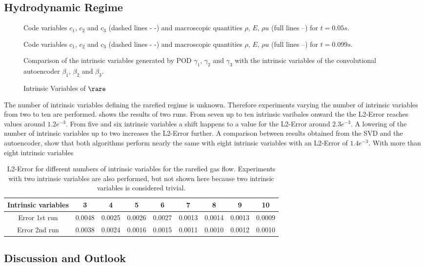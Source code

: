 \subsection{Hydrodynamic Regime}

\begin{figure}[!htbp]
	\scalebox{1}{}
	\caption{Code variables \(c_1\), \(c_2\) and \(c_3\) (dashed lines - -) and macroscopic quantities \(\rho\), \(E\), \(\rho u\) (full lines --) for \(t=0.05s\).}
\end{figure}
\begin{figure}[!htbp]
	\scalebox{1}{}
	\caption{Code variables \(c_1\), \(c_2\) and \(c_3\) (dashed lines - -) and macroscopic quantities \(\rho\), \(E\), \(\rho u\) (full lines --) for \(t=0.099s\).}
\end{figure}
\begin{figure}[!htbp]
	\scalebox{.6}{}
	\caption{Comparison of the intrinsic variables generated by POD \(\gamma_1\), \(\gamma_2\) and \(\gamma_3\) with the intrinsic variables of the convolutional autoencoder \(\beta_1\), \(\beta_2\) and \(\beta_3\).}
\end{figure}

\begin{figure}[!hp]
	\scalebox{0.9}{}
	\caption{Intrinsic Variables of $\rare$}
\end{figure}
The number of intrinsic variables defining the rarefied regime is unknown. Therefore experiments varying the number of intrinsic variables from two to ten are performed.  shows the results of two runs. From seven up to ten intrinsic varibales onward the the L2-Error reaches values around \(1.2e^{-3}\). From five and six intrinsic variables a shift happens to a value for the L2-Error around \(2.3e^{-3}\). A lowering of the number of intrinsic variables up to two increases the L2-Error further. A comparison between results obtained from the SVD and the autoencoder, show that both algorithms perform nearly the same with eight intrinsic variables with an L2-Error of \(1.4e^{-3}\). With more than eight intrinsic variables  
\begin{table}[!htbp]\centering
	\begin{tabular}{ |c|c|c|c|c|c|c|c|c| }
		\hline
		Intrinsic variables  & 3 & 4 & 5 & 6 & 7 & 8 & 9 & 10 \\ [.5ex]
		\hline
		Error 1st run & 0.0048 & 0.0025 & 0.0026 & 0.0027 & 0.0013 & 0.0014 & 0.0013 & 0.0009\\ \hline
		Error 2nd run & 0.0038 & 0.0024 & 0.0016 & 0.0015 & 0.0011 & 0.0010 & 0.0012 & 0.0010\\\hline
	\end{tabular}
	\caption{L2-Error for different numbers of intrinsic variables for the rarefied gas flow. Experiments with two intrinsic variables are also performed, but not shown here because two intrinsic variables is considered trivial.}
	\label{Tab:Intrinsic units}
\end{table}
\subsection{Discussion and Outlook}